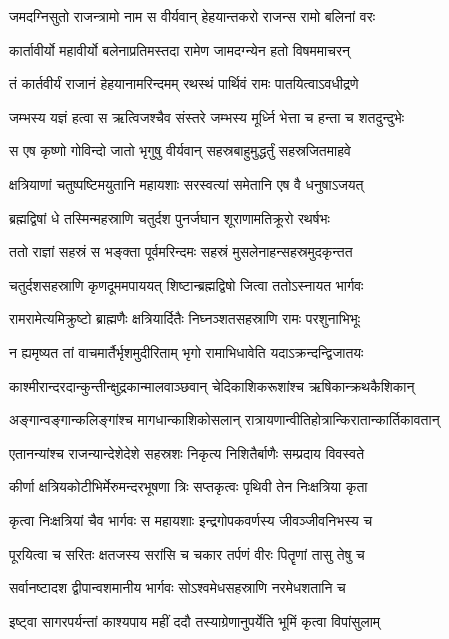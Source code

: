 \twolineshloka
{जमदग्निसुतो राजन्त्रामो नाम स वीर्यवान्}
{हेहयान्तकरो राजन्स रामो बलिनां वरः}


\twolineshloka
{कार्तावीर्यो महावीर्यो बलेनाप्रतिमस्तदा}
{रामेण जामदग्न्येन हतो विषममाचरन्}


\twolineshloka
{तं कार्तवीर्यं राजानं हेहयानामरिन्दमम्}
{रथस्थं पार्थिवं रामः पातयित्वाऽवधीद्रणे}


\twolineshloka
{जम्भस्य यज्ञं हत्वा स ऋत्विजश्चैव संस्तरे}
{जम्भस्य मूर्ध्नि भेत्ता च हन्ता च शतदुन्दुभेः}


\twolineshloka
{स एष कृष्णो गोविन्दो जातो भृगुषु वीर्यवान्}
{सहस्रबाहुमुद्धर्तुं सहस्रजितमाहवे}


\twolineshloka
{क्षत्रियाणां चतुष्पष्टिमयुतानि महायशाः}
{सरस्वत्यां समेतानि एष वै धनुषाऽजयत्}


\twolineshloka
{ब्रह्मद्विषां धे तस्मिन्महस्राणि चतुर्दश}
{पुनर्जघान शूराणामतिक्रूरो रथर्षभः}


\twolineshloka
{ततो राज्ञां सहस्रं स भङ्क्ता पूर्वमरिन्दमः}
{सहस्रं मुसलेनाहन्सहस्रमुदकृन्तत}


\twolineshloka
{चतुर्दशसहस्राणि कृणदूममपाययत्}
{शिष्टान्ब्रह्मद्विषो जित्वा ततोऽस्नायत भार्गवः}


\twolineshloka
{रामरामेत्यमिक्रुष्टो ब्राह्मणैः क्षत्रियार्दितैः}
{निघ्नञ्शतसहस्राणि रामः परशुनाभिभूः}


\twolineshloka
{न ह्यमृष्यत तां वाचमार्तैर्भृशमुदीरिताम्}
{भृगो रामाभिधावेति यदाऽक्रन्दन्द्विजातयः}


\twolineshloka
{काश्मीरान्दरदान्कुन्तीन्क्षुद्रकान्मालवाञ्छवान्}
{चेदिकाशिकरूशांश्च ऋषिकान्क्रथकैशिकान्}


\twolineshloka
{अङ्गान्वङ्गान्कलिङ्गांश्च मागधान्काशिकोसलान्}
{रात्रायणान्वीतिहोत्रान्किरातान्कार्तिकावतान्}


\twolineshloka
{एतानन्यांश्च राजन्यान्देशेदेशे सहस्रशः}
{निकृत्य निशितैर्बाणैः सम्प्रदाय विवस्वते}


\twolineshloka
{कीर्णा क्षत्रियकोटीभिर्मेरुमन्दरभूषणा}
{त्रिः सप्तकृत्वः पृथिवी तेन निःक्षत्रिया कृता}


\twolineshloka
{कृत्वा निःक्षत्रियां चैव भार्गवः स महायशाः}
{इन्द्रगोपकवर्णस्य जीवञ्जीवनिभस्य च}


\twolineshloka
{पूरयित्वा च सरितः क्षतजस्य सरांसि च}
{चकार तर्पणं वीरः पितॄणां तासु तेषु च}


\twolineshloka
{सर्वानष्टादश द्वीपान्वशमानीय भार्गवः}
{सोऽश्वमेधसहस्राणि नरमेधशतानि च}


\twolineshloka
{इष्ट्वा सागरपर्यन्तां काश्यपाय महीं ददौ}
{तस्याग्रेणानुपर्येति भूमिं कृत्वा विपांसुलाम्}


